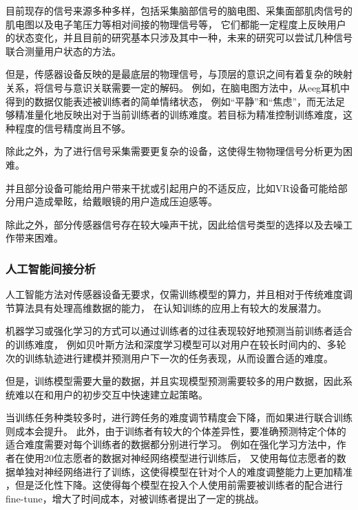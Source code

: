 \documentclass[12pt]{article}
\begin{document}
            目前现存的信号来源多种多样，包括采集脑部信号的脑电图、采集面部肌肉信号的肌电图以及电子笔压力等相对间接的物理信号等，
            它们都能一定程度上反映用户的状态变化，并且目前的研究基本只涉及其中一种，未来的研究可以尝试几种信号联合测量用户状态的方法。

            但是，传感器设备反映的是最底层的物理信号，与顶层的意识之间有着复杂的映射关系，将信号与意识关联需要一定的解码。
            例如，在脑电图方法中，从eeg耳机中得到的数据仅能表述被训练者的简单情绪状态，
            例如“平静”和“焦虑”，而无法足够精准量化地反映出对于当前训练者的训练难度。若目标为精准控制训练难度，这种程度的信号精度尚且不够。

            除此之外，为了进行信号采集需要更复杂的设备，这使得生物物理信号分析更为困难。

            并且部分设备可能给用户带来干扰或引起用户的不适反应，比如VR设备可能给部分用户造成晕眩，给戴眼镜的用户造成压迫感等。

            除此之外，部分传感器信号存在较大噪声干扰，因此给信号类型的选择以及去噪工作带来困难。
            
            \subsubsection{人工智能间接分析}
            人工智能方法对传感器设备无要求，仅需训练模型的算力，并且相对于传统难度调节算法具有处理高维数据的能力，
            在认知训练的应用上有较大的发展潜力。

            机器学习或强化学习的方式可以通过训练者的过往表现较好地预测当前训练者适合的训练难度，
            例如贝叶斯方法和深度学习模型可以对用户在较长时间内的、多轮次的训练轨迹进行建模并预测用户下一次的任务表现，从而设置合适的难度。

            但是，训练模型需要大量的数据，并且实现模型预测需要较多的用户数据，因此系统难以在和用户的初步交互中快速建立起策略。
            
            当训练任务种类较多时，进行跨任务的难度调节精度会下降，而如果进行联合训练则成本会提升。
            此外，由于训练者有较大的个体差异性，要准确预测特定个体的适合难度需要对每个训练者的数据都分别进行学习。
            例如在强化学习方法中，作者在使用20位志愿者的数据对神经网络模型进行训练后，
            又使用每位志愿者的数据单独对神经网络进行了训练，这使得模型在针对个人的难度调整能力上更加精准
            ，但是泛化性下降。这使得每个模型在投入个人使用前需要被训练者的配合进行fine-tune，增大了时间成本，对被训练者提出了一定的挑战。
            
\end{document}
